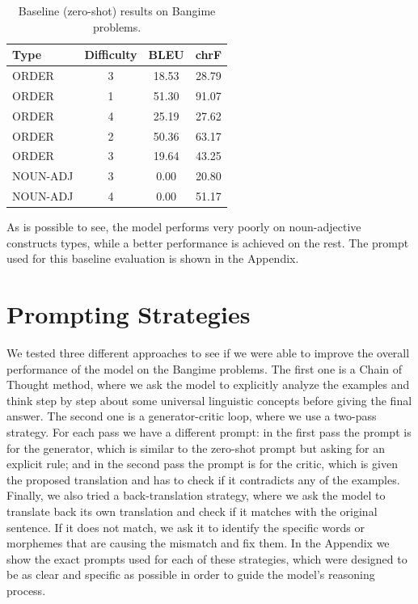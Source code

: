 \documentclass[
	a4paper, %
	10pt, %
	unnumberedsections, %
	twoside, %
]{LTJournalArticle}
\begin{document}
\begin{table}[h]
\centering
\caption{Baseline (zero-shot) results on Bangime problems.}
\label{tab:baseline}
\begin{tabular}{l c c c}
\hline
\textbf{Type} & \textbf{Difficulty} & \textbf{BLEU} & \textbf{chrF} \\
\hline
ORDER    & 3 & 18.53 & 28.79 \\
ORDER    & 1 & 51.30 & 91.07 \\
ORDER    & 4 & 25.19 & 27.62 \\
ORDER    & 2 & 50.36 & 63.17 \\
ORDER    & 3 & 19.64 & 43.25 \\
NOUN-ADJ & 3 &  0.00 & 20.80 \\
NOUN-ADJ & 4 &  0.00 & 51.17 \\
\hline
\end{tabular}
\end{table}

As is possible to see, the model performs very poorly on noun-adjective constructs types, while a better performance is achieved on the rest.
The prompt used for this baseline evaluation is shown in the Appendix.

\section{Prompting Strategies}

We tested three different approaches to see if we were able to improve the overall performance of the model on the Bangime problems. The first one is a Chain of Thought method, where we ask the model to explicitly analyze the examples and think step by step about some universal linguistic concepts before giving the final answer. The second one is a generator-critic loop, where we use a two-pass strategy. For each pass we have a different prompt: in the first pass the prompt is for the generator, which is similar to the zero-shot prompt but asking for an explicit rule; and in the second pass the prompt is for the critic, which is given the proposed translation and has to check if it contradicts any of the examples. Finally, we also tried a back-translation strategy, where we ask the model to translate back its own translation and check if it matches with the original sentence. If it does not match, we ask it to identify the specific words or morphemes that are causing the mismatch and fix them.
In the Appendix we show the exact prompts used for each of these strategies, which were designed to be as clear and specific as possible in order to guide the model's reasoning process.
\end{document}
